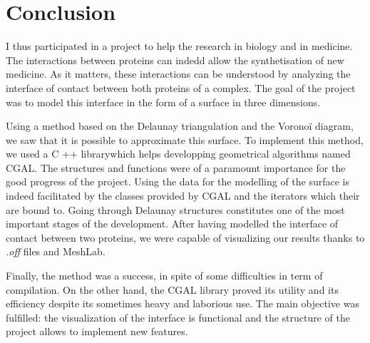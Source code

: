\chapter*{Conclusion}
I thus participated in a project to help the research in biology and in medicine.
The interactions between proteins can indedd allow the synthetisation of new medicine.
 As it matters, these interactions can be understood by analyzing the interface of
  contact between both proteins of a complex. The goal of the project was to model
   this interface in the form of a surface in three dimensions.

   Using a method based on the Delaunay triangulation and the
   Voronoï diagram, we saw that it is possible to approximate this surface.
   To implement this method, we used a C ++ librarywhich helps developping
geometrical algorithms named CGAL. The structures and functions were of a paramount
 importance for the good progress of the project.
     Using the data for the modelling of the surface is indeed facilitated
     by the classes provided by CGAL and the iterators which their are bound to. Going through
Delaunay structures constitutes one of the most important stages of
       the development. After having modelled the interface of contact between two proteins, we
 were capable of visualizing our results thanks to \textit{.off } files
  and MeshLab.

  Finally, the method was a success, in spite of some difficulties in term of compilation.
   On the other hand, the CGAL library proved its utility and its efficiency
   despite its sometimes heavy and laborious use.
  The main objective was fulfilled: the visualization of the interface is functional and
  the structure of the project allows to implement new features.
